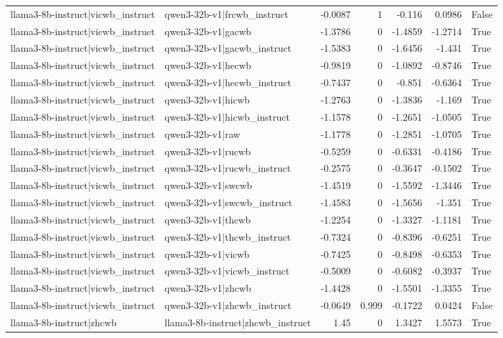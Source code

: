 \begin{table}
\begin{tabular}{l l r r r r l}
llama3-8b-instruct|vicwb_instruct & qwen3-32b-v1|frcwb_instruct & -0.0087 & 1 & -0.116 & 0.0986 & False \\
llama3-8b-instruct|vicwb_instruct & qwen3-32b-v1|gacwb & -1.3786 & 0 & -1.4859 & -1.2714 & True \\
llama3-8b-instruct|vicwb_instruct & qwen3-32b-v1|gacwb_instruct & -1.5383 & 0 & -1.6456 & -1.431 & True \\
llama3-8b-instruct|vicwb_instruct & qwen3-32b-v1|hecwb & -0.9819 & 0 & -1.0892 & -0.8746 & True \\
llama3-8b-instruct|vicwb_instruct & qwen3-32b-v1|hecwb_instruct & -0.7437 & 0 & -0.851 & -0.6364 & True \\
llama3-8b-instruct|vicwb_instruct & qwen3-32b-v1|hicwb & -1.2763 & 0 & -1.3836 & -1.169 & True \\
llama3-8b-instruct|vicwb_instruct & qwen3-32b-v1|hicwb_instruct & -1.1578 & 0 & -1.2651 & -1.0505 & True \\
llama3-8b-instruct|vicwb_instruct & qwen3-32b-v1|raw & -1.1778 & 0 & -1.2851 & -1.0705 & True \\
llama3-8b-instruct|vicwb_instruct & qwen3-32b-v1|rucwb & -0.5259 & 0 & -0.6331 & -0.4186 & True \\
llama3-8b-instruct|vicwb_instruct & qwen3-32b-v1|rucwb_instruct & -0.2575 & 0 & -0.3647 & -0.1502 & True \\
llama3-8b-instruct|vicwb_instruct & qwen3-32b-v1|swcwb & -1.4519 & 0 & -1.5592 & -1.3446 & True \\
llama3-8b-instruct|vicwb_instruct & qwen3-32b-v1|swcwb_instruct & -1.4583 & 0 & -1.5656 & -1.351 & True \\
llama3-8b-instruct|vicwb_instruct & qwen3-32b-v1|thcwb & -1.2254 & 0 & -1.3327 & -1.1181 & True \\
llama3-8b-instruct|vicwb_instruct & qwen3-32b-v1|thcwb_instruct & -0.7324 & 0 & -0.8396 & -0.6251 & True \\
llama3-8b-instruct|vicwb_instruct & qwen3-32b-v1|vicwb & -0.7425 & 0 & -0.8498 & -0.6353 & True \\
llama3-8b-instruct|vicwb_instruct & qwen3-32b-v1|vicwb_instruct & -0.5009 & 0 & -0.6082 & -0.3937 & True \\
llama3-8b-instruct|vicwb_instruct & qwen3-32b-v1|zhcwb & -1.4428 & 0 & -1.5501 & -1.3355 & True \\
llama3-8b-instruct|vicwb_instruct & qwen3-32b-v1|zhcwb_instruct & -0.0649 & 0.999 & -0.1722 & 0.0424 & False \\
llama3-8b-instruct|zhcwb & llama3-8b-instruct|zhcwb_instruct & 1.45 & 0 & 1.3427 & 1.5573 & True \\

\end{tabular}
\end{table}
